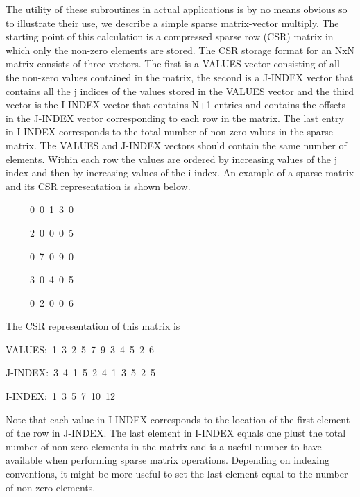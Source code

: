 The utility of these subroutines in actual applications is by no means
obvious so to illustrate their use, we describe a simple sparse matrix-vector
multiply. The starting point of this calculation is a compressed sparse
row (CSR) matrix in which only the non-zero elements are stored. The
CSR storage format for an NxN matrix consists of three vectors. The
first is a VALUES vector consisting of all the non-zero values contained
in the matrix, the second is a J-INDEX vector that contains all the
j indices of the values stored in the VALUES vector and the third
vector is the I-INDEX vector that contains N+1 entries and contains
the offsets in the J-INDEX vector corresponding to each row in the
matrix. The last entry in I-INDEX corresponds to the total number
of non-zero values in the sparse matrix. The VALUES and J-INDEX vectors
should contain the same number of elements. Within each row the values
are ordered by increasing values of the j index and then by increasing
values of the i index. An example of a sparse matrix and its CSR representation
is shown below. 
\begin{lyxcode}
~~~~~0~0~1~3~0

~~~~~2~0~0~0~5

~~~~~0~7~0~9~0

~~~~~3~0~4~0~5

~~~~~0~2~0~0~6
\end{lyxcode}
The CSR representation of this matrix is
\begin{lyxcode}
VALUES:~1~3~2~5~7~9~3~4~5~2~6~

J-INDEX:~3~4~1~5~2~4~1~3~5~2~5~

I-INDEX:~1~3~5~7~10~12
\end{lyxcode}
Note that each value in I-INDEX corresponds to the location of the
first element of the row in J-INDEX. The last element in I-INDEX equals
one plust the total number of non-zero elements in the matrix and
is a useful number to have available when performing sparse matrix
operations. Depending on indexing conventions, it might be more useful
to set the last element equal to the number of non-zero elements.

